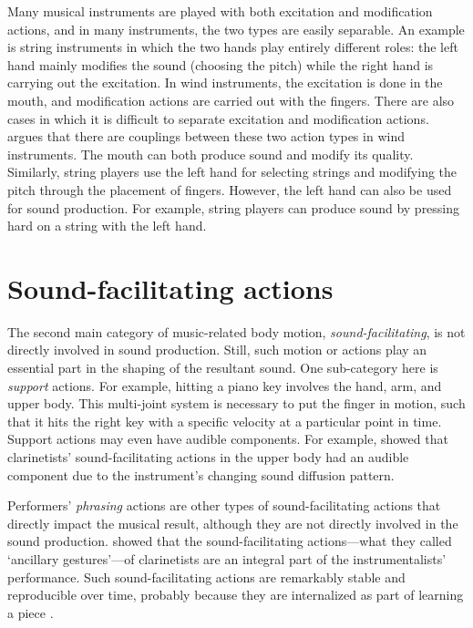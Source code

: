 Many musical instruments are played with both excitation and modification actions, and in many instruments, the two types are easily separable. An example is string instruments in which the two hands play entirely different roles: the left hand mainly modifies the sound (choosing the pitch) while the right hand is carrying out the excitation. In wind instruments, the excitation is done in the mouth, and modification actions are carried out with the fingers.  There are also cases in which it is difficult to separate excitation and modification actions. \citet{kvifte_instruments_1989} argues that there are couplings between these two action types in wind instruments. The mouth can both produce sound and modify its quality. Similarly, string players use the left hand for selecting strings and modifying the pitch through the placement of fingers. However, the left hand can also be used for sound production. For example, string players can produce sound by pressing hard on a string with the left hand.


\section{Sound-facilitating actions}

The second main category of music-related body motion, \emph{sound-facilitating}, is not directly involved in sound production. Still, such motion or actions play an essential part in the shaping of the resultant sound. One sub-category here is \emph{support} actions. For example, hitting a piano key involves the hand, arm, and upper body. This multi-joint system is necessary to put the finger in motion, such that it hits the right key with a specific velocity at a particular point in time. Support actions may even have audible components. For example, \citet{wanderley_improving_1999} showed that clarinetists' sound-facilitating actions in the upper body had an audible component due to the instrument's changing sound diffusion pattern.

Performers' \emph{phrasing} actions are other types of sound-facilitating actions that directly impact the musical result, although they are not directly involved in the sound production. \citet{wanderley_evaluation_2002} showed that the sound-facilitating actions---what they called `ancillary gestures'---of clarinetists are an integral part of the instrumentalists' performance. Such sound-facilitating actions are remarkably stable and reproducible over time, probably because they are internalized as part of learning a piece  \citep{campbell_observation_2005}.

